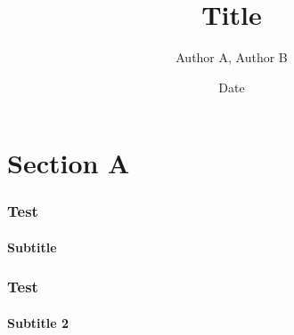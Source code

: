 \documentclass[10pt, compress,usetitleprogressbar,aspectratio=1610]{beamer}
\title[Short title]{Title}
\date{Date}
\author{Author A\inst{1}, Author B\inst{2}}
\institute{\inst{1} Institution A \and \inst{2} Institution B}
\begin{document}
\maketitle

\section{Section A}

\begin{frame}
\frametitle{Test}
\framesubtitle{Subtitle}

\lipsum[2]

\end{frame}

\begin{frame}
\frametitle{Test}
\framesubtitle{Subtitle 2}

\lipsum[1]

\end{frame}
\end{document}
